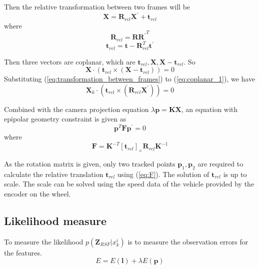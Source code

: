 \documentclass[letterpaper, 10 pt, conference]{ieeeconf}  %
\begin{document}
Then the relative transformation between two frames will be
\begin{equation}
\mathbf{X}=\mathbf{R}_{rel} \mathbf{X}^\prime + \mathbf{t}_{rel}
\label{eq:transformation_between_frames}
\end{equation}
where
\begin{equation}
\mathbf{R}_{rel} = \mathbf{R} {\mathbf{R}^\prime}^T
\end{equation}
\begin{equation}
\mathbf{t}_{rel}=\mathbf{t} - \mathbf{R}_{rel}^T \mathbf{t}^\prime
\end{equation}

Then three vectors are coplanar, which are $\mathbf{t}_{rel},\mathbf{X},\mathbf{X}-\mathbf{t}_{rel}$. So
\begin{equation}
  \mathbf{X}\cdot\left(\mathbf{t}_{rel}\times\left(\mathbf{X}-\mathbf{t}_{rel}\right)\right)=0
  \label{eq:coplanar_1}
\end{equation}
Substituting (\ref{eq:transformation_between_frames}) to (\ref{eq:coplanar_1}), we have
\begin{equation}
  \mathbf{X}_k\cdot\left(\mathbf{t}_{rel}\times\left(\mathbf{R}_{rel}\mathbf{X}^\prime\right)\right)=0
\end{equation}

Combined with the camera projection equation $\lambda \mathbf{p}=\mathbf{K}\mathbf{X}$, an equation with epipolar geometry constraint is given as
\begin{equation}
\mathbf{p}^T \mathbf{F} \mathbf{p}^\prime=0
\end{equation}
where
\begin{equation}
\mathbf{F} = \mathbf{K}^{-T} {\left[\mathbf{t}_{rel}\right]}_\times \mathbf{R}_{rel} \mathbf{K}^{-1}
\label{eq:F}
\end{equation}

As the rotation matrix is given, only two tracked points $\mathbf{p}_1,\mathbf{p}_2$ are required to calculate the relative translation $\mathbf{t}_{rel}$ using (\ref{eq:F}). The solution of $\mathbf{t}_{rel}$ is up to scale. The scale can be solved using the speed data of the vehicle provided by the encoder on the wheel.

\subsection{Likelihood measure}
To measure the likelihood $p(\mathbf{Z}_{RSF} | x_k^i)$ is to measure the observation errors for the features.
\begin{equation}
E= E(\mathbf{l}) + \lambda E(\mathbf{p})
\end{equation}
\end{document}
